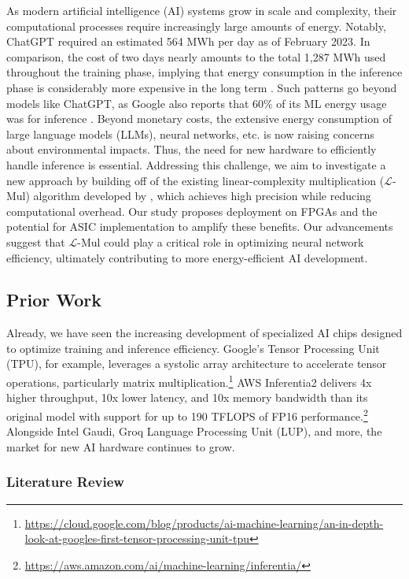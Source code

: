 \documentclass[12pt,letterpaper]{article}
\newcommand{\lmul}{$\mathcal{L}$-Mul\xspace}
\begin{document}
As modern artificial intelligence (AI) systems grow in scale and complexity, their computational processes require increasingly large amounts of energy. Notably, ChatGPT required an estimated 564 MWh per day as of February 2023. In comparison, the cost of two days nearly amounts to the total 1,287 MWh used throughout the training phase, implying that energy consumption in the inference phase is considerably more expensive in the long term \citep{de2023growing}. Such patterns go beyond models like ChatGPT, as Google also reports that 60\% of its ML energy usage was for inference \citep{carbonfootprint2022}. Beyond monetary costs, the extensive energy consumption of large language models (LLMs), neural networks, etc. is now raising concerns about environmental impacts. Thus, the need for new hardware to efficiently handle inference is essential. Addressing this challenge, we aim to investigate a new approach by building off of the existing linear-complexity multiplication (\lmul) algorithm developed by \cite{luo2024addition}, which achieves high precision while reducing computational overhead. Our study proposes deployment on FPGAs and the potential for ASIC implementation to amplify these benefits. Our advancements suggest that \lmul could play a critical role in optimizing neural network efficiency, ultimately contributing to more energy-efficient AI development.


\subsection{Prior Work}

Already, we have seen the increasing development of specialized AI chips designed to optimize training and inference efficiency. Google's Tensor Processing Unit (TPU), for example, leverages a systolic array architecture to accelerate tensor operations, particularly matrix multiplication.\footnote{\url{https://cloud.google.com/blog/products/ai-machine-learning/an-in-depth-look-at-googles-first-tensor-processing-unit-tpu}} AWS Inferentia2 delivers 4x higher throughput, 10x lower latency, and 10x memory bandwidth than its original model with support for up to 190 TFLOPS of FP16 performance.\footnote{\url{https://aws.amazon.com/ai/machine-learning/inferentia/}} Alongside Intel Gaudi, Groq Language Processing Unit (LUP), and more, the market for new AI hardware continues to grow.

\subsubsection*{Literature Review}
\end{document}
